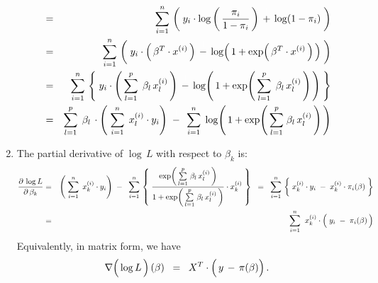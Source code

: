 \begin{enumerate}
\begin{eqnarray*}
	&=&
		\overset{n}{\underset{i=1}{\sum}}\,
		\left(\;
			y_{i}\cdot\log\left(\,\dfrac{\pi_{i}}{1 - \pi_{i}}\,\right)
			\, \overset{{\color{white}\vert}}{+} \,
			\log\!\left(1 - \pi_{i}\right)
			\;\right)	
	\\
	&=&
		\overset{n}{\underset{i=1}{\sum}}\,
		\left(\;
			y_{i}\cdot\left(\,\beta^{T} \cdot x^{(i)}\,\right)
			\, \overset{{\color{white}\vert}}{-} \,
			\log\!\left(\,1 + \exp\!\left(\,\beta^{T} \cdot x^{(i)}\,\right)\,\right)
			\;\right)	
	\\
	&=&
		\overset{n}{\underset{i=1}{\sum}}\,
		\left\{\;
			y_{i}\cdot\left(\,\overset{p}{\underset{l=1}{\sum}}\;\,\beta_{l}\,x^{(i)}_{l}\,\right)
			\, \overset{{\color{white}\vert}}{-} \,
			\log\!\left(\,1 + \exp\!\left(\,\overset{p}{\underset{l=1}{\sum}}\;\,\beta_{l}\,x^{(i)}_{l}\,\right)\,\right)
			\;\right\}	
	\\
	&=&
		\overset{p}{\underset{l=1}{\sum}}\;\,
		\beta_{l}\,
		\cdot
		\left(\; \overset{n}{\underset{i=1}{\sum}}\;\, x^{(i)}_{l} \cdot y_{i} \right)
	\; \overset{{\color{white}\vert}}{-} \;\,
		\overset{n}{\underset{i=1}{\sum}}\;
		\log\!\left(\,1 + \exp\!\left(\,\overset{p}{\underset{l=1}{\sum}}\;\beta_{l}\,x^{(i)}_{l}\,\right)\,\right)
	\end{eqnarray*}
\item
	The partial derivative of $\log\,L$ with respect to $\beta_{k}$ is:
	\begin{eqnarray*}
	\dfrac{\partial\,\log L}{\partial\,\beta_{k}}
	&=&
		\left(\; \overset{n}{\underset{i=1}{\sum}}\;\, x^{(i)}_{k} \cdot y_{i} \right)
		\; - \;\;
		\overset{n}{\underset{i=1}{\sum}}\,
		\left\{\;
			\dfrac{
				\exp\!\left(\,\overset{p}{\underset{l=1}{\sum}}\;\beta_{l}\,x^{(i)}_{l}\,\right)
				}{
				1 + \exp\!\left(\,\overset{p}{\underset{l=1}{\sum}}\;\beta_{l}\,x^{(i)}_{l}\,\right)
				}
			\cdot
			x^{(i)}_{k}
			\;\right\}	
	\;\; = \;\;
		\overset{n}{\underset{i=1}{\sum}}\,
		\left\{\;
			x^{(i)}_{k} \cdot y_{i}
			\; \overset{{\color{white}\vert}}{-} \;
			x^{(i)}_{k} \cdot \pi_{i}(\beta)
			\;\right\}	
	\\
	&=&
		\overset{n}{\underset{i=1}{\sum}}\;\;
		x^{(i)}_{k}	
		\cdot
		\left(\; y_{i} \; \overset{{\color{white}.}}{-} \; \pi_{i}(\beta) \,\right)
	\end{eqnarray*}
	Equivalently, in matrix form, we have
	\begin{equation*}
	\nabla\!\left(\,\overset{{\color{white}.}}{\log}\,L\,\right)(\beta)
	\;\; = \;\;
		X^{T} \cdot \left(\, y \,\overset{{\color{white}.}}{-}\, \pi(\beta) \right).
	\end{equation*}

\end{enumerate}
